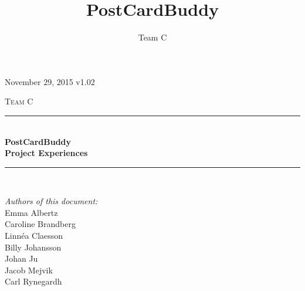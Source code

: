 \documentclass[10pt,a4paper]{article}
\title{PostCardBuddy}
\author{Team C}
\begin{document}
\begin{titlepage}
\newcommand{\HRule}{\rule{\linewidth}{0.5mm}}


\begin{flushright}
November 29, 2015 v1.02\\[3cm]
\end{flushright}


\centering
\textsc{\LARGE Team C}\\[0.5cm]

\HRule \\[0.4cm]
{ \huge \bfseries PostCardBuddy}\\[0.3cm]
{\Large \bfseries Project Experiences}\\[0.4cm] %
\HRule \\[1.5cm]

\vfill
\begin{flushleft}
\textit{Authors of this document:}\\
Emma Albertz\\
Caroline Brandberg\\
Linnéa Claesson\\
Billy Johansson\\
Johan Ju\\
Jacob Mejvik\\
Carl Rynegardh
\end{flushleft}

\end{titlepage}



%



\setcounter{tocdepth}{2}
\tableofcontents
\newpage
{}

\end{document}
